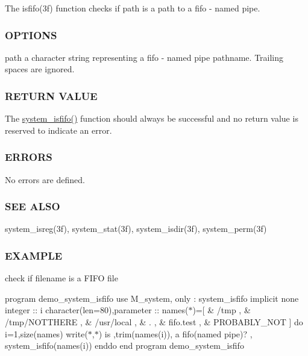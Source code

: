 The isfifo(3f) function checks if path is a path to a fifo -\/ named pipe.

\subsubsection*{O\+P\+T\+I\+O\+NS}

path a character string representing a fifo -\/ named pipe pathname. Trailing spaces are ignored.

\subsubsection*{R\+E\+T\+U\+RN V\+A\+L\+UE}

The \mbox{\hyperlink{namespacem__system_aa2bdb5f75405d87934c10756b539d082}{system\+\_\+isfifo()}} function should always be successful and no return value is reserved to indicate an error.

\subsubsection*{E\+R\+R\+O\+RS}

No errors are defined.

\subsubsection*{S\+EE A\+L\+SO}

system\+\_\+isreg(3f), system\+\_\+stat(3f), system\+\_\+isdir(3f), system\+\_\+perm(3f)

\subsubsection*{E\+X\+A\+M\+P\+LE}

check if filename is a F\+I\+FO file

program demo\+\_\+system\+\_\+isfifo use M\+\_\+system, only \+: system\+\_\+isfifo implicit none integer \+:\+: i character(len=80),parameter \+:\+: names($\ast$)=\mbox{[} \& \textquotesingle{}/tmp \textquotesingle{}, \& \textquotesingle{}/tmp/\+N\+O\+T\+T\+H\+E\+RE \textquotesingle{}, \& \textquotesingle{}/usr/local \textquotesingle{}, \& \textquotesingle{}. \textquotesingle{}, \& \textquotesingle{}fifo.\+test \textquotesingle{}, \& \textquotesingle{}P\+R\+O\+B\+A\+B\+L\+Y\+\_\+\+N\+OT \textquotesingle{}\mbox{]} do i=1,size(names) write($\ast$,$\ast$)\textquotesingle{} is \textquotesingle{},trim(names(i)),\textquotesingle{} a fifo(named pipe)? \textquotesingle{}, system\+\_\+isfifo(names(i)) enddo end program demo\+\_\+system\+\_\+isfifo 

